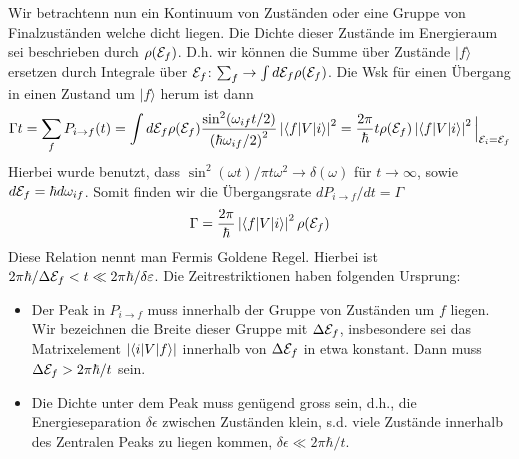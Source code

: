 Wir betrachtenn nun ein Kontinuum von Zuständen oder eine Gruppe von Finalzuständen
welche dicht liegen. Die Dichte dieser Zustände im Energieraum sei beschrieben durch
$\rho(\mathcal{E}_f)$. D.h. wir können die Summe über Zustände $|f\rangle$ ersetzen durch
Integrale über $\mathcal{E}_f$: $\sum_f \rightarrow \int d \mathcal{E}_f \rho(\mathcal{E}_f)$. Die Wsk für
einen Übergang in einen Zustand um $|f\rangle$ herum ist dann
\begin{align*}
    \Gamma t = \sum_f P_{i \rightarrow f} (t)
    = \int d \mathcal{E}_f \rho(\mathcal{E}_f) \frac{\sin^2(\omega_{if} t / 2)}{\left( \hbar \omega_{if} / 2 \right)^2} \left\vert \langle f | V | i \rangle \right\vert^2
    = \frac{2 \pi}{\hbar} t \rho(\mathcal{E}_f) \left\vert \langle f | V | i \rangle \right\vert^2 \Big|_{\mathcal{E}_i = \mathcal{E}_f}
\end{align*}
Hierbei wurde benutzt, dass $\sin^2(\omega t) / \pi t \omega^2 \rightarrow
\delta(\omega)$ für $t \rightarrow \infty$, sowie $d \mathcal{E}_f = \hbar d \omega_{if}$.
Somit finden wir die Übergangsrate $dP_{i \rightarrow f} / dt = \Gamma$
\begin{align*}
    \Gamma = \frac{2 \pi}{\hbar} \left\vert \langle f | V | i \rangle \right\vert^2 \rho(\mathcal{E}_f)
\end{align*}
Diese Relation nennt man Fermis Goldene Regel. Hierbei ist $2 \pi \hbar / \Delta \mathcal{E}_f
< t \ll 2 \pi \hbar / \delta \varepsilon$. Die Zeitrestriktionen haben folgenden Ursprung:
\begin{itemize}
    \item Der Peak in $P_{i \rightarrow f}$ muss innerhalb der Gruppe von Zuständen
        um $f$ liegen. Wir bezeichnen die Breite dieser Gruppe mit $\Delta \mathcal{E}_f$,
        insbesondere sei das Matrixelement $\left\vert \langle i | V | f \rangle \right\vert$
        innerhalb von $\Delta \mathcal{E}_f$ in etwa konstant. Dann muss $\Delta \mathcal{E}_f > 2 \pi
        \hbar / t$ sein.
    \item Die Dichte unter dem Peak muss genügend gross sein, d.h., die Energieseparation
        $\delta \epsilon$ zwischen Zuständen klein, s.d. viele Zustände innerhalb des
        Zentralen Peaks zu liegen kommen, $\delta \epsilon \ll 2 \pi \hbar / t$.
\end{itemize}